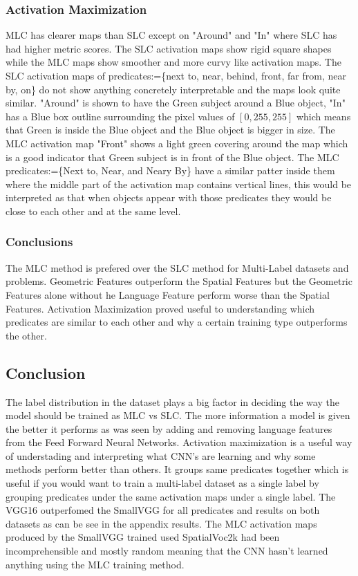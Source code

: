 \documentclass{csfyp}
\begin{document}
\subsubsection{Activation Maximization}
MLC has clearer maps than SLC except on "Around" and "In" where SLC has had higher metric scores. The SLC activation maps show rigid square shapes while the MLC maps show smoother and more curvy like activation maps. The SLC activation maps of \Gls{predicate}s:=\{next to, near, behind, front, far from, near by, on\} do not show anything concretely interpretable and the maps look quite similar. "Around" is shown to have the Green subject around a Blue object, "In" has a Blue box outline surrounding the pixel values of $[0,255,255]$ which means that Green is inside the Blue object and the Blue object is bigger in size. The MLC activation map "Front" shows a light green covering around the map which is a good indicator that Green subject is in front of the Blue object. The MLC \Gls{predicate}s:=\{Next to, Near, and Neary By\} have a similar patter inside them where the middle part of the activation map contains vertical lines, this would be interpreted as that when objects appear with those \Gls{predicate}s they would be close to each other and at the same level.
 
\subsubsection{Conclusions}
The MLC method is prefered over the SLC method for Multi-Label datasets and problems. Geometric Features outperform the Spatial Features but the Geometric Features alone without he Language Feature perform worse than the Spatial Features. Activation Maximization proved useful to understanding which \Gls{predicate}s are similar to each other and why a certain training type outperforms the other.

\subsection{Conclusion}
The label distribution in the dataset plays a big factor in deciding the way the model should be trained as MLC vs SLC. The more information a model is given the better it performs as was seen by adding and removing language features from the Feed Forward Neural Networks. Activation maximization is a useful way of understading and interpreting what CNN's are learning and why some methods perform better than others. It groups same \Gls{predicate}s together which is useful if you would want to train a multi-label dataset as a single label by grouping \Gls{predicate}s under the same activation maps under a single label. The VGG16 outperfomed the SmallVGG for all \Gls{predicate}s and results on both datasets as can be see in the appendix results. The MLC activation maps produced by the SmallVGG trained used SpatialVoc2k had been incomprehensible and mostly random meaning that the CNN hasn't learned anything using the MLC training method.
\end{document}
